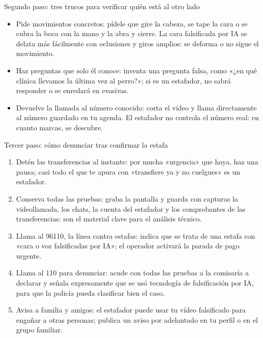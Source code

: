 \begin{tcbinfo}{Segundo paso: tres trucos para verificar quién está al otro lado}
\begin{itemize}
  \item Pide movimientos concretos: pídele que gire la cabeza, se tape la cara o se cubra la boca con la mano y la abra y cierre. La cara falsificada por IA se delata más fácilmente con oclusiones y giros amplios: se deforma o no sigue el movimiento.
  \item Haz preguntas que solo él conoce: inventa una pregunta falsa, como «¿en qué clínica llevamos la última vez al perro?»; si es un estafador, no sabrá responder o se enredará en evasivas.
  \item Devuelve la llamada al número conocido: corta el vídeo y llama directamente al número guardado en tu agenda. El estafador no controla el número real: en cuanto marcas, se descubre.
\end{itemize}

\end{tcbinfo}

\begin{tcbwarn}{Tercer paso: cómo denunciar tras confirmar la estafa}
\begin{enumerate}
  \item Detén las transferencias al instante: por mucha «urgencia» que haya, haz una pausa; casi todo el que te apura con «transfiere ya y no cuelgues» es un estafador.
  \item Conserva todas las pruebas: graba la pantalla y guarda con capturas la videollamada, los chats, la cuenta del estafador y los comprobantes de las transferencias: son el material clave para el análisis técnico.
  \item Llama al 96110, la línea contra estafas: indica que se trata de una estafa con «cara o voz falsificadas por IA»; el operador activará la parada de pago urgente.
  \item Llama al 110 para denunciar: acude con todas las pruebas a la comisaría a declarar y señala expresamente que se usó tecnología de falsificación por IA, para que la policía pueda clasificar bien el caso.
  \item Avisa a familia y amigos: el estafador puede usar tu vídeo falsificado para engañar a otras personas; publica un aviso por adelantado en tu perfil o en el grupo familiar.
\end{enumerate}

\end{tcbwarn}

